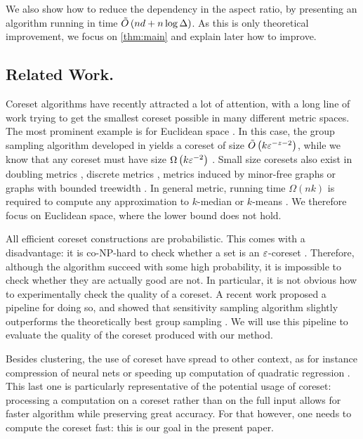 We also show how to reduce the dependency in the aspect ratio, by presenting an algorithm running in time $\tilde O\left( nd + n \log \Delta\right)$. As this is only theoretical improvement, we focus on \cref{thm:main} and explain later how to improve.


\subsection{Related Work.}

Coreset algorithms have recently attracted a lot of attention, with a long line of work trying to get the smallest coreset possible in many different metric spaces. The most prominent example is for Euclidean space \cite{}. In this case, the group sampling algorithm developed in \cite{stoc21, stoc22} yields a coreset of size $\tilde O\left( k \varepsilon^{-z-2}\right)$, while we know that any coreset must have size $\Omega \left( k\varepsilon^{-2}\right)$ \cite{stoc22}.
Small size coresets also exist in doubling metrics \cite{}, discrete metrics \cite{}, metrics induced by minor-free graphs \cite{} or graphs with bounded treewidth \cite{}. 
In general metric, running time $\Omega(nk)$ is required to compute any approximation to $k$-median or $k$-means \cite{}. We therefore focus on Euclidean space, where the lower bound does not hold.


All efficient coreset constructions are probabilistic. This comes with a disadvantage: it is co-NP-hard to check whether a set is an $\varepsilon$-coreset \cite{chrisESA}. Therefore, although the algorithm succeed with some high probability, it is impossible to check whether they are actually good are not. 
In particular, it is not obvious how to experimentally check the quality of a coreset.
A recent work proposed a pipeline for doing so, and showed that sensitivity sampling algorithm slightly outperforms the theoretically best group sampling \cite{chrisESA}. 
We will use this pipeline to evaluate the quality of the coreset produced with our method.

Besides clustering, the use of coreset have spread to other context, as for instance compression of neural nets \cite{} or speeding up computation of quadratic regression \cite{}.
This last one is particularly representative of the potential usage of coreset: processing a computation on a coreset rather than on the full input allows for faster algorithm while preserving great accuracy.
For that however, one needs to compute the coreset fast: this is our goal in the present paper.